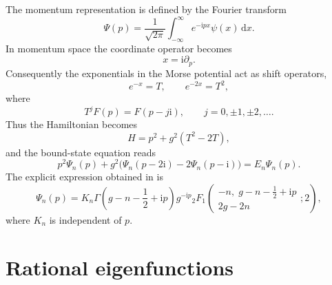 \documentclass[11pt,reqno]{amsart}
\newcommand{\ii}{\mathrm{i}}
\newcommand{\dd}{\mathrm{d}}
\numberwithin{equation}{section}
\begin{document}
The momentum representation is defined by the Fourier transform
\begin{equation}
  \Psi(p)=\frac{1}{\sqrt{2\pi}}
  \int_{-\infty}^{\infty} e^{-\ii px}\psi(x)\,\dd x.
  \label{eq:fourier}
\end{equation}
In momentum space the coordinate operator becomes
\begin{equation}
  x=\ii\partial_p.
\end{equation}
Consequently the exponentials in the Morse potential act as shift operators,
\begin{equation}
  e^{-x}=T,
  \qquad e^{-2x}=T^2,
  \label{eq:shift_exp}
\end{equation}
where
\begin{equation}
  T^jF(p)=F(p-j\ii),
  \qquad j=0,\pm1,\pm2,\dots .
  \label{eq:shift_def}
\end{equation}
Thus the Hamiltonian becomes
\begin{equation}
  H=p^2+g^2(T^2-2T),
  \label{eq:momentum_hamiltonian}
\end{equation}
and the bound-state equation reads
\begin{equation}
  p^2\Psi_n(p)+g^2\bigl(\Psi_n(p-2\ii)-2\Psi_n(p-\ii)\bigr)
  =E_n\Psi_n(p).
  \label{eq:momentum_difference_eq}
\end{equation}
The explicit expression obtained in \cite{SunDong2012} is
\begin{equation}
  \Psi_n(p)=K_n\Gamma\!\left(g-n-\frac12+\ii p\right)g^{-\ii p}
  {}_2F_1\!\left(
  \begin{matrix}
  -n,\; g-n-\frac12+\ii p\\
  2g-2n
  \end{matrix};2
  \right),
  \label{eq:sun_dong}
\end{equation}
where $K_n$ is independent of $p$.

\section{Rational eigenfunctions}\label{sec:rational}
\end{document}

